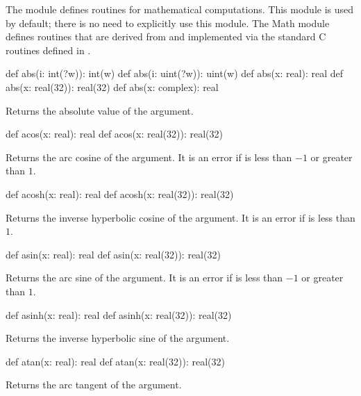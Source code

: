 The module  defines routines for mathematical computations.
This module is used by default; there is no need to explicitly use
this module.  The Math module defines routines that are derived from
and implemented via the standard C routines defined in .

\vspace{1pc}

\begin{protohead}
def abs(i: int(?w)): int(w)
def abs(i: uint(?w)): uint(w)
def abs(x: real): real
def abs(x: real(32)): real(32)
def abs(x: complex): real
\end{protohead}
\begin{protobody}
Returns the absolute value of the argument.
\end{protobody}

\begin{protohead}
def acos(x: real): real
def acos(x: real(32)): real(32)
\end{protohead}
\begin{protobody}
Returns the arc cosine of the argument.  It is an error if  is
less than $-1$ or greater than $1$.
\end{protobody}

\begin{protohead}
def acosh(x: real): real
def acosh(x: real(32)): real(32)
\end{protohead}
\begin{protobody}
Returns the inverse hyperbolic cosine of the argument.  It is an error
if  is less than $1$.
\end{protobody}

\begin{protohead}
def asin(x: real): real
def asin(x: real(32)): real(32)
\end{protohead}
\begin{protobody}
Returns the arc sine of the argument.  It is an error if  is
less than $-1$ or greater than $1$.
\end{protobody}

\begin{protohead}
def asinh(x: real): real
def asinh(x: real(32)): real(32)
\end{protohead}
\begin{protobody}
Returns the inverse hyperbolic sine of the argument.
\end{protobody}

\begin{protohead}
def atan(x: real): real
def atan(x: real(32)): real(32)
\end{protohead}
\begin{protobody}
Returns the arc tangent of the argument.
\end{protobody}

